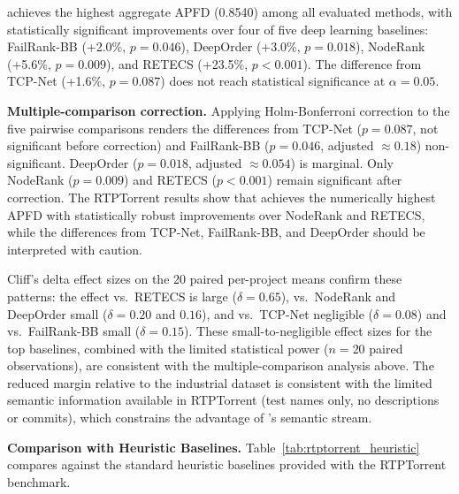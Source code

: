 \filopriori{} achieves the highest aggregate APFD (0.8540) among all
evaluated methods, with statistically significant improvements over four of
five deep learning baselines: FailRank-BB (+2.0\%, $p=0.046$), DeepOrder
(+3.0\%, $p=0.018$), NodeRank (+5.6\%, $p=0.009$), and RETECS (+23.5\%,
$p<0.001$). The difference from TCP-Net (+1.6\%, $p=0.087$) does not reach
statistical significance at $\alpha=0.05$.

\textbf{Multiple-comparison correction.} Applying Holm-Bonferroni correction
to the five pairwise comparisons renders the differences from TCP-Net
($p=0.087$, not significant before correction) and FailRank-BB ($p=0.046$,
adjusted $\approx 0.18$) non-significant. DeepOrder ($p=0.018$, adjusted
$\approx 0.054$) is marginal. Only NodeRank ($p=0.009$) and RETECS
($p<0.001$) remain significant after correction. The RTPTorrent results
show that \filopriori{} achieves the numerically highest APFD with
statistically robust improvements over NodeRank and RETECS, while the
differences from TCP-Net, FailRank-BB, and DeepOrder should be interpreted
with caution.

Cliff's delta effect sizes on the 20 paired per-project means confirm
these patterns: the effect vs.\ RETECS is large ($\delta = 0.65$),
vs.\ NodeRank and DeepOrder small ($\delta = 0.20$ and $0.16$),
and vs.\ TCP-Net negligible ($\delta = 0.08$) and vs.\ FailRank-BB small ($\delta = 0.15$).
These small-to-negligible effect sizes for the top baselines,
combined with the limited statistical power ($n = 20$ paired observations),
are consistent with the multiple-comparison analysis above.
The reduced margin relative to the industrial dataset is consistent with the
limited semantic information available in RTPTorrent (test names only, no
descriptions or commits), which constrains the advantage of \filopriori{}'s
semantic stream.

\textbf{Comparison with Heuristic Baselines.}
Table~\ref{tab:rtptorrent_heuristic} compares \filopriori{} against the
standard heuristic baselines provided with the RTPTorrent benchmark.

